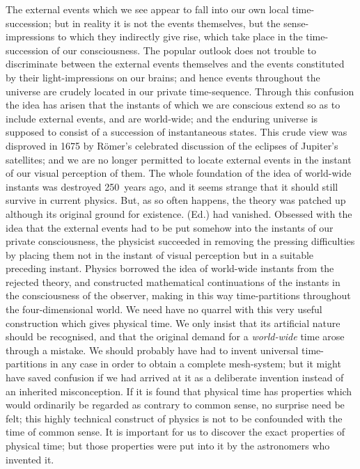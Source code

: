 \documentclass[12pt]{book}
\begin{document}
The external events which we see appear to fall into our own local
time-succession; but in reality it is not the events themselves, but the
sense-impressions to which they indirectly give rise, which take place in the
time-succession of our consciousness. The popular outlook does not trouble to
discriminate between the external events themselves and the events constituted
by their light-impressions on our brains; and hence events throughout the
universe are crudely located in our private time-sequence. Through this confusion
the idea has arisen that the instants of which we are conscious extend
so as to include external events, and are world-wide; and the enduring universe
is supposed to consist of a succession of instantaneous states. This crude view
was disproved in 1675 by Römer's celebrated discussion of the eclipses of
Jupiter's satellites; and we are no longer permitted to locate external events
in the instant of our visual perception of them. The whole foundation of the
idea of world-wide instants was destroyed 250~years ago, and it seems strange
that it should still survive in current physics. But, as so often happens, the
theory was patched up although its original \footnotemark\footnotetext
   {ground for existence. (Ed.)}
had vanished.
Obsessed with the idea that the external events had to be put somehow into the
instants of our private consciousness, the physicist succeeded in removing
the pressing difficulties by placing them not in the instant of visual perception
but in a suitable preceding instant. Physics borrowed the idea of world-wide
instants from the rejected theory, and constructed mathematical continuations
of the instants in the consciousness of the observer, making in this way time-partitions
throughout the four-dimensional world. We need have no quarrel
with this very useful construction which gives physical time. We only insist
that its artificial nature should be recognised, and that the original demand
for a \emph{world-wide} time arose through a mistake. We should probably have
had to invent universal time-partitions in any case in order to obtain a complete
mesh-system; but it might have saved confusion if we had arrived at it
as a deliberate invention instead of an inherited misconception. If it is found
that physical time has properties which would ordinarily be regarded as contrary
to common sense, no surprise need be felt; this highly technical construct
of physics is not to be confounded with the time of common sense. It is important
for us to discover the exact properties of physical time; but those
properties were put into it by the astronomers who invented it.
\end{document}
